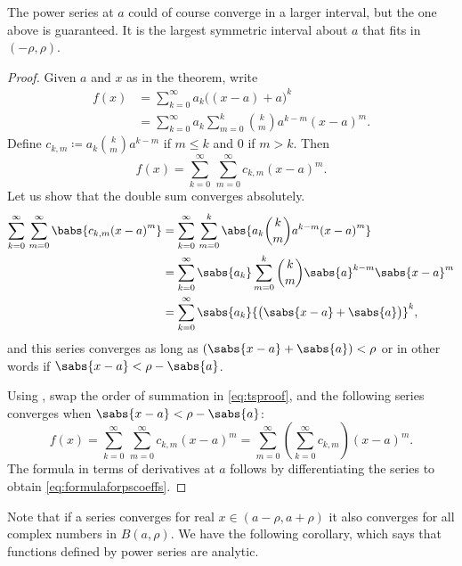 The power series at $a$ could of course converge in a larger interval, but
the one above is guaranteed.  It is the largest symmetric interval about
$a$ that fits in $(-\rho,\rho)$.

\begin{proof}
Given $a$ and $x$ as in the theorem,
write
\begin{equation*}
\begin{split}
f(x) &= \sum_{k=0}^\infty a_k {\bigl((x-a)+a\bigr)}^k \\
&= \sum_{k=0}^\infty a_k \sum_{m=0}^k \binom{k}{m} a^{k-m} {(x-a)}^m .
\end{split}
\end{equation*}
Define $c_{k,m} \coloneqq a_k \binom{k}{m} a^{k-m}$ if $m \leq k$ and $0$ if $m >
k$.  Then 
\begin{equation} \label{eq:tsproof}
f(x) = \sum_{k=0}^\infty \, \sum_{m=0}^\infty c_{k,m} {(x-a)}^m .
\end{equation}
Let us show that the double sum converges absolutely.
\begin{equation*}
\begin{split}
\sum_{k=0}^\infty \, \sum_{m=0}^\infty \babs{ c_{k,m} {(x-a)}^m}
& = \sum_{k=0}^\infty \, \sum_{m=0}^k \abs{ a_k \binom{k}{m} a^{k-m} {(x-a)}^m }
\\
& = \sum_{k=0}^\infty \sabs{a_k} \sum_{m=0}^k \binom{k}{m} \sabs{a}^{k-m}
{\sabs{x-a}}^m  \\
& = \sum_{k=0}^\infty \sabs{a_k} {\bigl(\sabs{x-a}+\sabs{a}\bigr)}^k ,
\end{split}
\end{equation*}
and this series converges as long as 
$(\sabs{x-a}+\sabs{a}) < \rho$ or in other words if
$\sabs{x-a} < \rho-\sabs{a}$.

Using ,
swap the order of summation in \eqref{eq:tsproof}, and 
the following series converges when $\sabs{x-a} < \rho-\sabs{a}$:
\begin{equation*}
f(x) =
\sum_{k=0}^\infty \, \sum_{m=0}^\infty c_{k,m} {(x-a)}^m
=
\sum_{m=0}^\infty
\left( \sum_{k=0}^\infty
c_{k,m} \right) {(x-a)}^m .
\end{equation*}
The formula in terms of derivatives at $a$ follows by
differentiating the series to obtain \eqref{eq:formulaforpscoeffs}.
\end{proof}

Note that if a series converges for real $x \in (a-\rho,a+\rho)$ it also converges
for all complex numbers in $B(a,\rho)$.
We have the following corollary, which says that functions defined
by power series are analytic.

